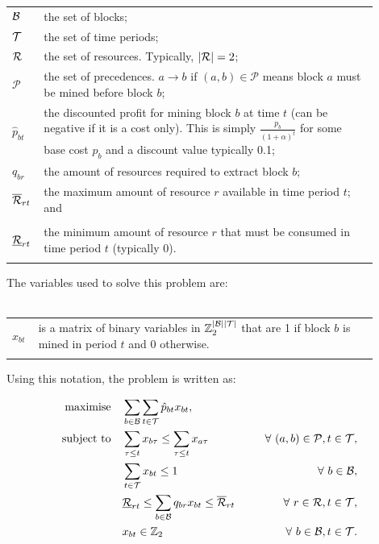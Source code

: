 \documentclass[journal]{IEEEtran}
\begin{document}
\begin{tabular}{p{0.05\linewidth}p{0.85\linewidth}}
$\S{B}$ & the set of blocks;\\
$\S{T}$ & the set of time periods;\\
$\S{R}$ & the set of resources. Typically, $|\S{R}| = 2$;\\
$\mathcal{P}$ & the set of precedences. $a \to b$ if $(a,b) \in \mathcal{P}$
                means block $a$ must be mined before block $b$;\\
$\hat{p}_{bt}$  & the discounted profit for mining block $b$ at time $t$
            (can be negative if it is a cost only). This
            is simply $\frac{p_b}{(1+\alpha)^t}$ for some base cost
            $p_b$ and a discount value typically 0.1;\\
$q_{br}$ & the amount of resources required to extract block $b$;\\
$\overline{\S{R}}_{rt}$ & the maximum amount of resource $r$ available in time period $t$; and\\\hfill\\
$\underline{\S{R}}_{rt}$ & the minimum amount of resource $r$ that must be consumed in time period $t$ (typically 0).\\\hfill\\
\end{tabular}
\par
The variables used to solve this problem are:\\\hfill\\
\begin{tabular}{p{0.05\linewidth}p{0.85\linewidth}}
$x_{bt}$ & is a matrix of binary variables in $\Bin^{|\S{B}||\S{T}|}$ that are 1 if block $b$ is mined in
                      period $t$ and 0 otherwise.\\\hfill\\
\end{tabular}

Using this notation, the problem is written as:

{\footnotesize
\begin{align}
\Max \quad & \displaystyle\sum_{b \in \S{B}}\displaystyle\sum_{t \in \S{T}} \hat{p}_{bt}x_{bt},\label{eq:cpit_form}\\
\ST \quad & \displaystyle\sum_{\tau \leq t}x_{b\tau} \leq \displaystyle\sum_{\tau \leq t}x_{a\tau} \qquad \qquad & \forall\ (a,b) \in \mathcal{P}, t \in \S{T},\nonumber\\
& \displaystyle\sum_{t \in \S{T}}x_{bt} \leq 1 & \forall\ b \in \S{B},\nonumber\\
& \underline{\S{R}}_{rt} \leq \displaystyle\sum_{b \in \S{B}}q_{br}x_{bt} \leq \overline{\S{R}}_{rt} & \forall\ r \in \S{R}, t \in \S{T},\nonumber\\
& x_{bt} \in \Bin & \forall\ b \in \S{B}, t \in \S{T}\nonumber.
\end{align}
}
\end{document}
